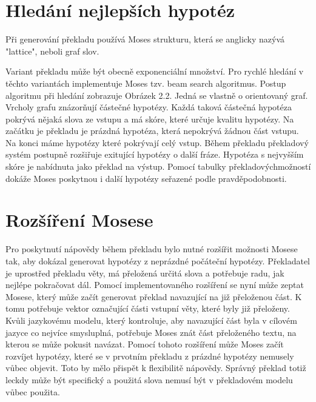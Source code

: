\section{Hledání nejlepších hypotéz}
Při generování překladu používá Moses strukturu, která se anglicky nazývá "lattice", neboli graf slov.

Variant překladu může být obecně exponenciální množství. Pro rychlé hledání v těchto variantách implementuje Moses tzv. beam search algoritmus. Postup algoritmu při hledání zobrazuje Obrázek 2.2. Jedná se vlastně o orientovaný graf. Vrcholy grafu znázorňují částečné hypotézy. Každá taková částečná hypotéza pokrývá nějaká slova ze vstupu a má skóre, které určuje kvalitu hypotézy. Na začátku je překladu je prázdná hypotéza, která nepokrývá žádnou část vstupu. Na konci máme hypotézy které pokrývají celý vstup. Během překladu překladový systém postupně rozšiřuje exitující hypotézy o další fráze. Hypotéza s nejvyšším skóre je nabídnuta jako překlad na výstup. Pomocí tabulky překladovýchmožností dokáže Moses poskytnou i další hypotézy seřazené podle pravděpodobnosti.

\section{Rozšíření Mosese}
Pro poskytnutí nápovědy během překladu bylo nutné rozšířit možnosti Mosese tak, aby dokázal generovat hypotézy z neprázdné počáteční hypotézy. Překladatel je uprostřed překladu věty, má přeložená určitá slova a potřebuje radu, jak nejlépe pokračovat dál. Pomocí implementovaného rozšíření se nyní může zeptat Mosese, který může začít generovat překlad navazující na již přeloženou část. K tomu potřebuje vektor označující části vstupní věty, které byly již přeloženy. Kvůli jazykovému modelu, který kontroluje, aby navazující část byla v cílovém jazyce co nejvíce smysluplná, potřebuje Moses znát část přeloženého textu, na kterou se může pokusit navázat. Pomocí tohoto rozšíření může Moses začít rozvíjet hypotézy, které se v prvotním překladu z prázdné hypotézy nemusely vůbec objevit. Toto by mělo přispět k flexibilitě nápovědy. Správný překlad totiž leckdy může být specifický a použitá slova nemusí být v překladovém modelu vůbec použita.









